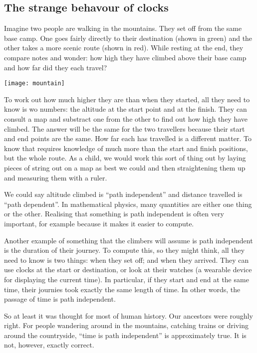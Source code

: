 \documentclass[a4paper]{report}
\begin{document}
\subsection*{The strange behavour of clocks}
Imagine two people are walking in the mountains. They set off from the same base camp. One goes fairly directly to their destination (shown in green) and the other takes a more scenic route (shown in red). While resting at the end, they compare notes and wonder: how high they have climbed above their base camp and how far did they each travel?

\texttt{[image: mountain]}

To work out how much higher they are than when they started, all they need to know is wo numbers: the altitude at the start point and at the finish. They can consult a map and substract one from the other to find out how high they have climbed. The answer will be the same for the two travellers because their start and end points are the same. 
How far each has travelled is a different matter. To know that requires knowledge of much more than the start and finish positions, but the whole route. As a child, we would work this sort of thing out by laying pieces of string out on a map as best we could and then straightening them up and measuring them with a ruler. 

We could say altitude climbed is ``path independent'' and distance travelled is ``path dependent''. In mathematical physics, many quantities are either one thing or the other. Realising that something is path independent is often very important, for example  because it makes it easier to compute. 

Another example of something that the climbers will assume is path independent is the duration of their journey. To compute this, so they might think, all they need to know is two things: when they set off; and when they arrived. They can use clocks at the start or destination, or look at their watches (a wearable device for displaying the current time). In particular, if they start and end at the same time, their journies took exactly the same length of time. In other words, the passage of time is path independent.

So at least it was thought for most of human history. Our ancestors were roughly right. For people wandering around in the mountains, catching trains or driving around the countryside, ``time is path independent'' is approximately true. It is not, however, exactly correct. 
\end{document}
